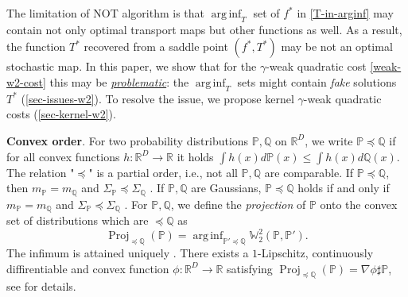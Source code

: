 \documentclass{article} %
\DeclareMathOperator*{\arginf}{arg\,inf}
\DeclareMathOperator{\Proj}{Proj}
\begin{document}
The limitation \citep[]{korotin2023neural} of NOT algorithm is that $\arginf_{T}$ set of $f^{*}$ in \eqref{T-in-arginf} may contain not only optimal transport maps but other functions as well. As a result, the function $T^{*}$ recovered from a saddle point $(f^{*},T^{*})$ may be not an optimal stochastic map. In this paper, we show that for the $\gamma$-weak quadratic cost \eqref{weak-w2-cost} this may be \underline{\textit{problematic}}: the $\arginf_{T}$ sets might contain \textit{fake} solutions $T^{*}$ (\wasyparagraph\ref{sec-issues-w2}). To resolve the issue, we propose kernel $\gamma$-weak quadratic costs (\wasyparagraph\ref{sec-kernel-w2}).

\vspace{-0.5mm}\textbf{Convex order}. For two probability distributions $\mathbb{P},\mathbb{Q}$ on $\mathbb{R}^{D}$, we write $\mathbb{P}\preceq\mathbb{Q}$ if for all convex functions $h:\mathbb{R}^{D}\rightarrow\mathbb{R}$ it holds $\int h(x)d\mathbb{P}(x)\leq \int h(x)d\mathbb{Q}(x)$.
The relation "$\preceq$" is a partial order, i.e., not all $\mathbb{P},\mathbb{Q}$ are comparable.
If $\mathbb{P}\preceq\mathbb{Q}$, then $m_{\mathbb{P}}=m_{\mathbb{Q}}$ and $\Sigma_{\mathbb{P}}\preceq\Sigma_{\mathbb{Q}}$ \citep[Lemma 3]{scarsini1998multivariate}.
If $\mathbb{P},\mathbb{Q}$ are Gaussians, $\mathbb{P}\preceq\mathbb{Q}$ holds if and only if $m_{\mathbb{P}}=m_{\mathbb{Q}}$ and $\Sigma_{\mathbb{P}}\preceq\Sigma_{\mathbb{Q}}$ \citep[Theorem 4]{scarsini1998multivariate}.
For $\mathbb{P},\mathbb{Q}$, we define the \textit{projection} of $\mathbb{P}$ onto the convex set of distributions which are $\preceq\mathbb{Q}$ as
\begin{equation}
    \Proj_{\preceq \mathbb{Q}}(\mathbb{P})=\arginf\nolimits_{\mathbb{P}'\preceq\mathbb{Q}}\mathbb{W}_{2}^{2}(\mathbb{P},\mathbb{P}').
    \label{conv-proj}
\end{equation}
The infimum is attained uniquely \citep[Proposition 1.1]{gozlan2020mixture}. There exists a  $1$-Lipschitz, continuously diffirentiable and convex function $\phi:\mathbb{R}^{D}\rightarrow\mathbb{R}$ satisfying $\Proj_{\preceq \mathbb{Q}}(\mathbb{P})=\nabla\phi\sharp\mathbb{P}$, see \citep[Theorem 1.2]{gozlan2020mixture} for details.
\end{document}
